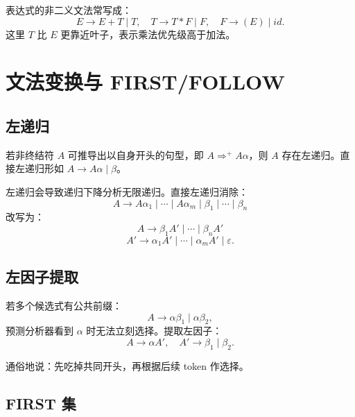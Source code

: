\documentclass[UTF8,fontset=none,11pt]{ctexart}
\newenvironment{defbox}[1][]{%
  \par\medskip\noindent{\color{defrule}\rule{\linewidth}{1.1pt}}\par\nopagebreak
  \noindent{\bfseries\color{defrule}#1}\par\nopagebreak\smallskip}%
  {\par\nopagebreak\smallskip\noindent{\color{defrule}\rule{\linewidth}{0.4pt}}\par\medskip}
\newcommand{\eps}{\varepsilon}
\begin{document}
表达式的非二义文法常写成：
\[
E\to E+T\mid T,\quad T\to T*F\mid F,\quad F\to (E)\mid id.
\]
这里 \(T\) 比 \(E\) 更靠近叶子，表示乘法优先级高于加法。

\section{文法变换与 FIRST/FOLLOW}

\subsection{左递归}

\begin{defbox}[左递归]
若非终结符 \(A\) 可推导出以自身开头的句型，即 \(A\Rightarrow^+ A\alpha\)，则 \(A\) 存在左递归。直接左递归形如 \(A\to A\alpha\mid\beta\)。
\end{defbox}

左递归会导致递归下降分析无限递归。直接左递归消除：
\[
A\to A\alpha_1\mid\cdots\mid A\alpha_m\mid\beta_1\mid\cdots\mid\beta_n
\]
改写为：
\[
A\to \beta_1A'\mid\cdots\mid\beta_nA'
\]
\[
A'\to \alpha_1A'\mid\cdots\mid\alpha_mA'\mid\eps.
\]

\begin{center}
\end{center}

\subsection{左因子提取}

若多个候选式有公共前缀：
\[
A\to \alpha\beta_1\mid\alpha\beta_2,
\]
预测分析器看到 \(\alpha\) 时无法立刻选择。提取左因子：
\[
A\to \alpha A',\quad A'\to \beta_1\mid\beta_2.
\]

通俗地说：先吃掉共同开头，再根据后续 token 作选择。

\subsection{FIRST 集}
\end{document}
